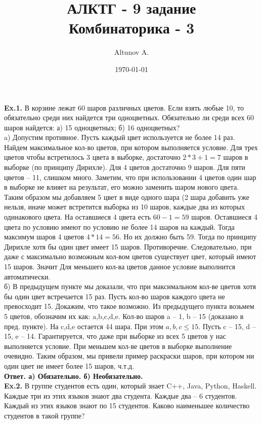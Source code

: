\documentclass[a4paper,12pt]{article}
\author{Altunov A.}
\title{АЛКТГ - 9 задание
\\
Комбинаторика - 3}
\date{\today}
\begin{document}
\maketitle
\newpage
\textbf{Ex.1.} В корзине лежат 60 шаров различных цветов. Если взять любые 10, то обязательно среди них найдется три одноцветных. Обязательно ли среди всех 60 шаров найдется: а) 15 одноцветных; б) 16 одноцветных?
\\

a) Допустим противное. Пусть каждый цвет используется не более 14 раз. Найдем максимальное кол-во цветов, при котором выполняется условие. Для трех цветов чтобы встретилось 3 цвета в выборке, достаточно $ 2 * 3 + 1 = 7 $ шаров в выборке (по принципу Дирихле). Для 4 цветов достаточно 9 шаров. Для пяти цветов -- 11, слишком много. Заметим, что при использовании 4 цветов один шар в выборке не влияет на результат, его можно заменить шаром нового цвета. Таким образом мы добавляем 5 цвет в виде одного шара (2 шара добавить уже нельзя, иначе может встретится выборка из 10 шаров, каждые два из которых одинакового цвета. На оставшиеся 4 цвета есть $ 60 - 1 = 59 $ шаров. Оставшиеся 4 цвета по условию имеют по условию не более 14 шаров на каждый. Тогда максимум шаров 4 цветов $ 4 * 14 = 56 $. Но их должно быть 59. Тогда по принципу Дирихле хотя бы один цвет имеет 15 шаров. Противоречие. Следовательно, при даже с максимально возможным кол-вом цветов существует цвет, который имеют 15 шаров. Значит Для меньшего кол-ва цветов данное условие выполнится автоматически.
\\

б) В предыдущем пункте мы доказали, что при максимальном кол-ве цветов хотя бы один цвет встречается 15 раз. Пусть кол-во шаров каждого цвета не превосходит 15. Докажим, что такое возможно. Из предыдущего пункта возьмем 5 цветов, обозначим их как: a,b,c,d,e. Кол-во шаров a -- 1, b -- 15 (доказано в пред. пункте). На c,d,e остается 44 шара. При этом $ a,b,c \leq 15 $. Пусть c -- 15, d -- 15, e -- 14. Гарантируется, что даже при выборке из всех 5 цветов у нас выполняется условие. При меньшем кол-ве цветов в выборке выполнение очевидно. Таким образом, мы привели пример раскраски шаров, при котором ни один цвет не имеет более 15 шаров, ч.т.д. 
\\
\textbf{Ответ. а) Обязательно. б) Необязательно.}
\\

\textbf{Ex.2.} В группе студентов есть один, который знает C++, Java, Python, Haskell. Каждые три из этих языков знают два студента. Каждые два -- 6 студентов. Каждый из этих языков знают по 15 студентов. Каково наименьшее количество студентов в такой группе?
\\
\end{document}
